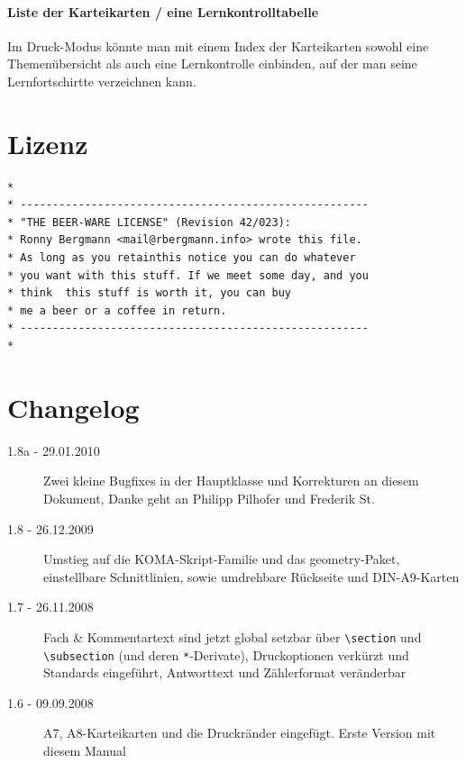 \documentclass[a4paper,DIV=calc]{scrartcl}
\begin{document}
\paragraph{Liste der Karteikarten / eine Lernkontrolltabelle} 
Im Druck-Modus könnte man mit einem Index der Karteikarten sowohl eine Themenübersicht als auch eine Lernkontrolle einbinden, auf der man seine Lernfortschirtte verzeichnen kann.
\section{Lizenz}
\begin{lstlisting}[basicstyle=\sffamily, numbers=none]
*
* ------------------------------------------------------
* "THE BEER-WARE LICENSE" (Revision 42/023):
* Ronny Bergmann <mail@rbergmann.info> wrote this file.
* As long as you retainthis notice you can do whatever
* you want with this stuff. If we meet some day, and you
* think  this stuff is worth it, you can buy
* me a beer or a coffee in return. 
* ------------------------------------------------------
*
\end{lstlisting}
\section{Changelog}
\begin{description}
	\item[1.8a - 29.01.2010] Zwei kleine Bugfixes in der Hauptklasse und Korrekturen an diesem Dokument, Danke geht an Philipp Pilhofer und Frederik St.
	\item[1.8 - 26.12.2009] Umstieg auf die KOMA-Skript-Familie und das geometry-Paket, einstellbare Schnittlinien, sowie umdrehbare Rückseite und DIN-A9-Karten
	\item[1.7 - 26.11.2008] Fach \& Kommentartext sind jetzt global setzbar über \lstinline!\section! und \lstinline!\subsection! (und deren \lstinline!*!-Derivate), Druckoptionen verkürzt und Standards eingeführt, Antworttext und Zählerformat veränderbar
	\item[1.6 - 09.09.2008] A7, A8-Karteikarten und die Druckränder eingefügt. Erste Version mit diesem Manual
\end{description}
\end{document}
